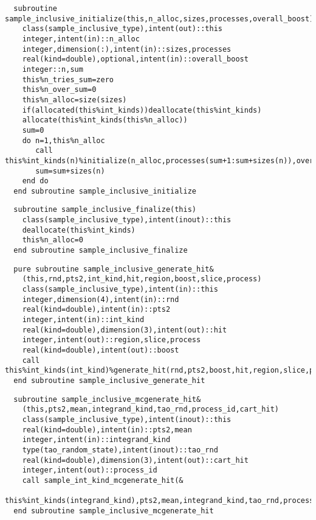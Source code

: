 \begin{Verbatim}
  subroutine sample_inclusive_initialize(this,n_alloc,sizes,processes,overall_boost)
    class(sample_inclusive_type),intent(out)::this
    integer,intent(in)::n_alloc
    integer,dimension(:),intent(in)::sizes,processes
    real(kind=double),optional,intent(in)::overall_boost
    integer::n,sum
    this%n_tries_sum=zero
    this%n_over_sum=0
    this%n_alloc=size(sizes)
    if(allocated(this%int_kinds))deallocate(this%int_kinds)
    allocate(this%int_kinds(this%n_alloc))
    sum=0
    do n=1,this%n_alloc
       call this%int_kinds(n)%initialize(n_alloc,processes(sum+1:sum+sizes(n)),overall_boost)
       sum=sum+sizes(n)
    end do
  end subroutine sample_inclusive_initialize
\end{Verbatim}

\begin{Verbatim}
  subroutine sample_inclusive_finalize(this)
    class(sample_inclusive_type),intent(inout)::this
    deallocate(this%int_kinds)
    this%n_alloc=0
  end subroutine sample_inclusive_finalize
\end{Verbatim}
  
\begin{Verbatim}
  pure subroutine sample_inclusive_generate_hit&
    (this,rnd,pts2,int_kind,hit,region,boost,slice,process)
    class(sample_inclusive_type),intent(in)::this
    integer,dimension(4),intent(in)::rnd
    real(kind=double),intent(in)::pts2
    integer,intent(in)::int_kind
    real(kind=double),dimension(3),intent(out)::hit
    integer,intent(out)::region,slice,process
    real(kind=double),intent(out)::boost
    call this%int_kinds(int_kind)%generate_hit(rnd,pts2,boost,hit,region,slice,process)
  end subroutine sample_inclusive_generate_hit
\end{Verbatim}

\begin{Verbatim}
  subroutine sample_inclusive_mcgenerate_hit&
    (this,pts2,mean,integrand_kind,tao_rnd,process_id,cart_hit)
    class(sample_inclusive_type),intent(inout)::this
    real(kind=double),intent(in)::pts2,mean
    integer,intent(in)::integrand_kind
    type(tao_random_state),intent(inout)::tao_rnd
    real(kind=double),dimension(3),intent(out)::cart_hit
    integer,intent(out)::process_id
    call sample_int_kind_mcgenerate_hit(&
         this%int_kinds(integrand_kind),pts2,mean,integrand_kind,tao_rnd,process_id,cart_hit)
  end subroutine sample_inclusive_mcgenerate_hit
\end{Verbatim}

